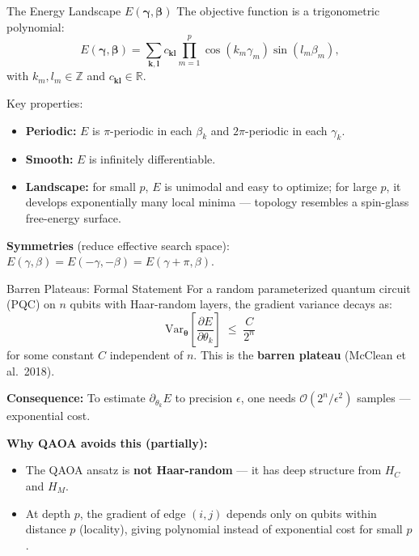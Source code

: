 \documentclass{beamer}
\begin{document}

\begin{frame}{The Energy Landscape $E(\boldsymbol{\gamma},\boldsymbol{\beta})$}
The objective function is a trigonometric polynomial:
\[
E(\boldsymbol{\gamma},\boldsymbol{\beta})
= \sum_{\mathbf{k},\mathbf{l}} c_{\mathbf{k}\mathbf{l}}
\prod_{m=1}^p \cos(k_m\gamma_m)\sin(l_m\beta_m),
\]
with $k_m,l_m\in\mathbb{Z}$ and $c_{\mathbf{kl}}\in\mathbb{R}$.

Key properties:
\begin{itemize}
\item \textbf{Periodic:} $E$ is $\pi$-periodic in each $\beta_k$ and
  $2\pi$-periodic in each $\gamma_k$.
\item \textbf{Smooth:} $E$ is infinitely differentiable.
\item \textbf{Landscape:} for small $p$, $E$ is unimodal and easy to
  optimize; for large $p$, it develops exponentially many local minima
  --- topology resembles a spin-glass free-energy surface.
\end{itemize}

\textbf{Symmetries} (reduce effective search space):
$E(\gamma,\beta) = E(-\gamma,-\beta) = E(\gamma+\pi,\beta)$.
\end{frame}


\begin{frame}{Barren Plateaus: Formal Statement}
For a random parameterized quantum circuit (PQC) on $n$ qubits with
Haar-random layers, the gradient variance decays as:
\[
\mathrm{Var}_{\boldsymbol{\theta}}\!\left[
\frac{\partial E}{\partial\theta_k}
\right]
\;\leq\; \frac{C}{2^n}
\]
for some constant $C$ independent of $n$. This is the
\textbf{barren plateau} (McClean et al.\ 2018).

\medskip

\textbf{Consequence:}  To estimate $\partial_{\theta_k} E$ to precision
$\epsilon$, one needs $\mathcal{O}(2^n/\epsilon^2)$ samples --- exponential cost.

\medskip

\textbf{Why QAOA avoids this (partially):}
\begin{itemize}
\item The QAOA ansatz is \textbf{not Haar-random} --- it has deep
  structure from $H_C$ and $H_M$.
\item At depth $p$, the gradient of edge $(i,j)$ depends only on
  qubits within distance $p$ (locality), giving polynomial instead of
  exponential cost for small $p$.
\end{itemize}
\end{frame}
\end{document}
